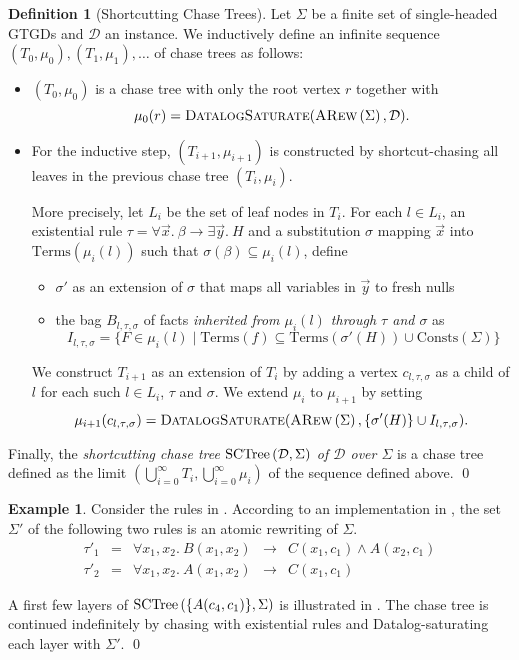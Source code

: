 \documentclass[12pt]{report}
\theoremstyle{plain}
\theoremstyle{definition}
\newtheorem{definition}[theorem]{Definition}
\newtheorem{example}[theorem]{Example}
\def\Consts{{\mathrm{Consts}}}
\def\Terms{{\mathrm{Terms}}}
\newcommand{\ARew}[1]{\ensuremath{\normalfont{\textsc{ARew}} \left( #1 \right)}}
\newcommand{\SCTree}[2]{\ensuremath{\normalfont{\textrm{SCTree}} \left( #1, #2 \right)}}
\begin{document}
\begin{definition}[Shortcutting Chase Trees]
  Let $\Sigma$ be a finite set of single-headed GTGDs and $\mathcal{D}$ an instance. We inductively define an infinite sequence $(T_0, \mu_0), (T_1, \mu_1), \ldots$ of chase trees as follows:
  \begin{itemize}
    \item $(T_0, \mu_0)$ is a chase tree with only the root vertex $r$ together with $$\mu_0(r) = \textsc{DatalogSaturate}(\ARew{\Sigma}, \mathcal{D}).$$
    \item For the inductive step, $(T_{i + 1}, \mu_{i + 1})$ is constructed by shortcut-chasing all leaves in the previous chase tree $(T_i, \mu_i)$.
    
    More precisely, let $L_i$ be the set of leaf nodes in $T_i$. For each $l \in L_i$, an existential rule $\tau = \forall \vec{x}.\ \beta \rightarrow \exists \vec{y}.\ H$ and a substitution $\sigma$ mapping $\vec{x}$ into $\Terms(\mu_i(l))$ such that $\sigma(\beta) \subseteq \mu_i(l)$, define
    \begin{itemize}
      \item $\sigma'$ as an extension of $\sigma$ that maps all variables in $\vec{y}$ to fresh nulls
      \item the bag $B_{l, \tau, \sigma}$ of facts \emph{inherited from $\mu_i(l)$ through $\tau$ and $\sigma$} as $$I_{l, \tau, \sigma} = \{ F \in \mu_i(l) \mid \Terms(f) \subseteq \Terms(\sigma'(H)) \cup \Consts(\Sigma) \}$$
    \end{itemize}
    We construct $T_{i+1}$ as an extension of $T_i$ by adding a vertex $c_{l, \tau, \sigma}$ as a child of $l$ for each such $l \in L_i$, $\tau$ and $\sigma$. We extend $\mu_i$ to $\mu_{i+1}$ by setting $$\mu_{i+1}(c_{l, \tau, \sigma}) = \textsc{DatalogSaturate}(\ARew{\Sigma}, \{ \sigma'(H) \} \cup I_{l, \tau, \sigma}).$$
  \end{itemize}
  Finally, the \emph{shortcutting chase tree $\SCTree{\mathcal{D}}{\Sigma}$ of $\mathcal{D}$ over $\Sigma$} is a chase tree defined as the limit $(\bigcup_{i = 0}^\infty T_i, \bigcup_{i = 0}^\infty \mu_i)$ of the sequence defined above.
  \qed
\end{definition}

\begin{example}
\label{sctree-simple-example}
  Consider the rules in . According to an implementation in \cite{Benedikt_Rewriting_the_Infinite}, the set $\Sigma'$ of the following two rules is an atomic rewriting of $\Sigma$.
  \[\begin{array}{ccrcl}
    \tau'_1 & = & \forall x_1, x_2.\ B(x_1, x_2) & \rightarrow & C(x_1, c_1) \wedge A(x_2, c_1) \\
    \tau'_2 & = & \forall x_1, x_2.\ A(x_1, x_2) & \rightarrow & C(x_1, c_1)
  \end{array}\]

  A first few layers of $\SCTree{\{ A(c_4, c_1) \}}{\Sigma}$ is illustrated in . The chase tree is continued indefinitely by chasing with existential rules and Datalog-saturating each layer with $\Sigma'$.
  \qed
\end{example}
\end{document}
